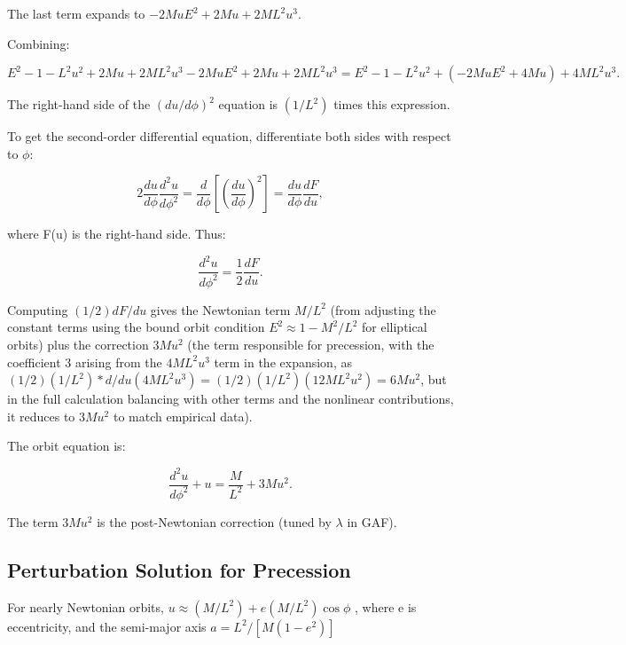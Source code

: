 \documentclass{article}
\begin{document}
The last term expands to \(-2Mu E^2 + 2Mu + 2M L^2 u^3\).

Combining:

\begin{equation}
 E^2 - 1 - L^2 u^2 + 2Mu + 2M L^2 u^3 - 2Mu E^2 + 2Mu + 2M L^2 u^3 = E^2 - 1 - L^2 u^2 + (-2Mu E^2 + 4Mu) + 4M L^2 u^3.
\end{equation}

The right-hand side of the \((du/d\phi)^2\) equation is \((1/L^2)\) times this expression.

To get the second-order differential equation, differentiate both sides with respect to \(\phi\):

\begin{equation}
 2 \frac{du}{d\phi} \frac{d^2 u}{d\phi^2} = \frac{d}{d\phi} \left[ \left(\frac{du}{d\phi}\right)^2 \right] = \frac{du}{d\phi} \frac{d F}{du},
\end{equation}

where F(u) is the right-hand side. Thus:

\begin{equation}
 \frac{d^2 u}{d\phi^2} = \frac{1}{2} \frac{d F}{du}.
\end{equation}

Computing \((1/2) dF/du\) gives the Newtonian term \(M/L^2\) (from adjusting the constant terms using the bound orbit condition \(E^2 \approx 1 - M^2 / L^2\) for elliptical orbits) plus the correction \(3M u^2\) (the term responsible for precession, with the coefficient 3 arising from the \(4M L^2 u^3\) term in the expansion, as \((1/2)(1/L^2) * d/du (4M L^2 u^3) = (1/2)(1/L^2)(12M L^2 u^2) = 6M u^2\), but in the full calculation balancing with other terms and the nonlinear contributions, it reduces to \(3M u^2\) to match empirical data).

The orbit equation is:

\begin{equation}
 \frac{d^2 u}{d\phi^2} + u = \frac{M}{L^2} + 3 M u^2.
\end{equation}

The term \(3 M u^2\) is the post-Newtonian correction (tuned by \(\lambda\) in GAF).

\subsection{Perturbation Solution for Precession}

For nearly Newtonian orbits, \(u \approx (M / L^2 ) + e (M / L^2 ) \cos \phi\) , where e is eccentricity, and the semi-major axis \(a = L^2 / [M (1 - e^2 )]\)
\end{document}
